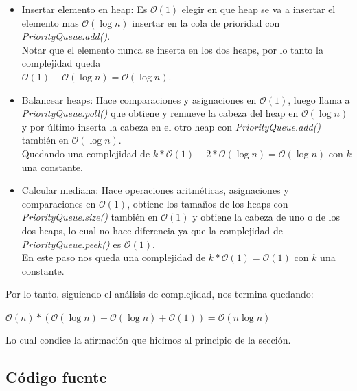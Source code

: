 \begin{itemize}
	\item Insertar elemento en heap: Es $\mathcal{O}(1)$ elegir en que heap se va a insertar el elemento mas $\mathcal{O}(\log{}n)$ insertar en la cola de prioridad con \emph{PriorityQueue.add()}.\\ Notar que el elemento nunca se inserta en los dos heaps, por lo tanto la complejidad queda\\ $\mathcal{O}(1) + \mathcal{O}(\log{}n) = \mathcal{O}(\log{}n)$.
	\item Balancear heaps: Hace comparaciones y asignaciones en $\mathcal{O}(1)$, luego llama a \emph{PriorityQueue.poll()} que obtiene y remueve la cabeza del heap en $\mathcal{O}(\log{}n)$ y por último inserta la cabeza en el otro heap con \emph{PriorityQueue.add()} también en $\mathcal{O}(\log{}n)$.\\ Quedando una complejidad de $k * \mathcal{O}(1) + 2 * \mathcal{O}(\log{}n) = \mathcal{O}(\log{}n)$ con $k$ una constante.
	\item Calcular mediana: Hace operaciones aritméticas, asignaciones y comparaciones en $\mathcal{O}(1)$, obtiene los tamaños de los heaps con \emph{PriorityQueue.size()} también en $\mathcal{O}(1)$ y obtiene la cabeza de uno o de los dos heaps, lo cual no hace diferencia ya que la complejidad de \emph{PriorityQueue.peek()} es $\mathcal{O}(1)$.\\ En este paso nos queda una complejidad de $k * \mathcal{O}(1) = \mathcal{O}(1)$ con $k$ una constante.
\end{itemize}

\noindent Por lo tanto, siguiendo el análisis de complejidad, nos termina quedando:
\begin{center}
	$\mathcal{O}(n) * (\mathcal{O}(\log{}n) + \mathcal{O}(\log{}n) + \mathcal{O}(1)) = \mathcal{O}(n\log{}n)$
\end{center}
Lo cual condice la afirmación que hicimos al principio de la sección.

\newpage
\subsection{Código fuente}





